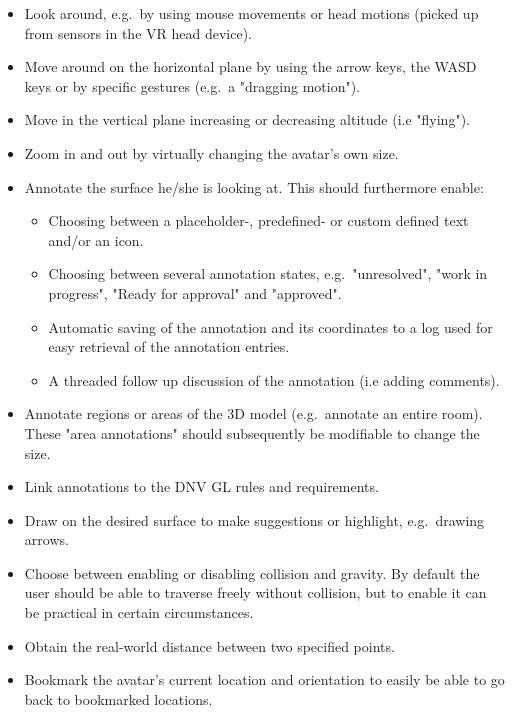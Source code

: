 \documentclass[UKenglish]{ifimaster}
\begin{document}
\begin{itemize}
	\item Look around, e.g.~by using mouse movements or head motions (picked up from sensors in the VR head device).
	\item Move around on the horizontal plane by using the arrow keys, the WASD keys or by specific gestures (e.g.~a "dragging motion").
	\item Move in the vertical plane increasing or decreasing altitude (i.e "flying").
	\item Zoom in and out by virtually changing the avatar's own size.
	\item Annotate the surface he/she is looking at. This should furthermore enable:
	\begin{itemize}
		\item Choosing between a placeholder-, predefined- or custom defined text and/or an icon.
		\item Choosing between several annotation states,  e.g.~"unresolved", "work in progress", "Ready for approval" and "approved".
		\item Automatic saving of the annotation and its coordinates to a log used for easy retrieval of the annotation entries. 
		\item A threaded follow up discussion of the annotation (i.e adding comments).
	\end{itemize}
	\item Annotate regions or areas of the 3D model (e.g.~annotate an entire room). These "area annotations" should subsequently be modifiable to change the size. 
	\item Link annotations to the DNV GL rules and requirements.
	\item Draw on the desired surface to make suggestions or highlight, e.g.~drawing arrows.
	\item Choose between enabling or disabling collision and gravity. By default the user should be able to traverse freely without collision, but to enable it can be practical in certain circumstances.
	\item Obtain the real-world distance between two specified points.
	\item Bookmark the avatar's current location and orientation to easily be able to go back to bookmarked locations. 
\end{itemize}
\end{document}
